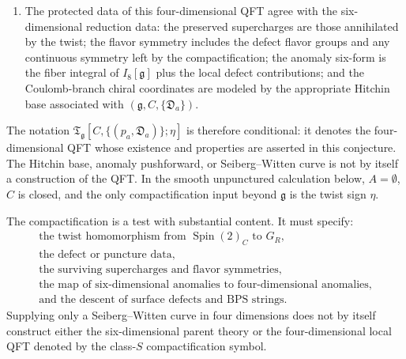 \begin{conjecture}
\begin{enumerate}[label=\textup{(\roman*)}]
\[\]
with local operator algebra, stress tensor multiplet, Hilbert-space
radial-quantization data, and extended operators descending from the
six-dimensional defect and finite-flux sectors after a choice of global
polarization when such a choice is required.
\item The protected data of this four-dimensional QFT agree with the
six-dimensional reduction data: the preserved supercharges are those
annihilated by the twist; the flavor symmetry includes the defect flavor
groups and any continuous symmetry left by the compactification; the anomaly
six-form is the fiber integral of \(I_8[\mathfrak g]\) plus the local defect
contributions; and the Coulomb-branch chiral coordinates are modeled by the
appropriate Hitchin base associated with
\((\mathfrak g,C,\{\mathfrak D_a\})\).
\end{enumerate}
The notation
\(\mathfrak T_{\mathfrak g}[C,\{(p_a,\mathfrak D_a)\};\eta]\) is therefore
conditional: it denotes the four-dimensional QFT whose existence and
properties are asserted in this conjecture.  The Hitchin base, anomaly
pushforward, or Seiberg--Witten curve is not by itself a construction of the
QFT.  In the smooth unpunctured calculation below, \(A=\emptyset\), \(C\) is
closed, and the only compactification input beyond \(\mathfrak g\) is the
twist sign \(\eta\).
\end{conjecture}

The compactification is a test with substantial content.  It must specify:
\[
\begin{gathered}
  \text{the twist homomorphism from }\operatorname{Spin}(2)_C\text{ to }G_R,\\
  \text{the defect or puncture data},\\
  \text{the surviving supercharges and flavor symmetries},\\
  \text{the map of six-dimensional anomalies to four-dimensional anomalies},\\
  \text{and the descent of surface defects and BPS strings.}
\end{gathered}
\]
Supplying only a Seiberg--Witten curve in four dimensions does not by itself
construct either the six-dimensional parent theory or the four-dimensional
local QFT denoted by the class-\(S\) compactification symbol.

